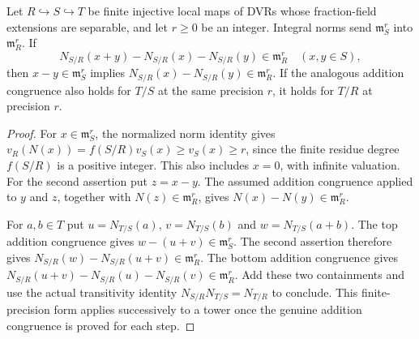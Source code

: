 \begin{lemma}
\label{fw:norm-congruence-tower}
\leanok
Let $R\hookrightarrow S\hookrightarrow T$ be finite injective
local maps of DVRs whose fraction-field extensions are separable,
and let $r\geq0$ be an integer. Integral norms send
$\mathfrak m_S^r$ into $\mathfrak m_R^r$.
If
\[
 N_{S/R}(x+y)-N_{S/R}(x)-N_{S/R}(y)\in\mathfrak m_R^r
 \quad(x,y\in S),
\]
then $x-y\in\mathfrak m_S^r$ implies
$N_{S/R}(x)-N_{S/R}(y)\in\mathfrak m_R^r$.
If the analogous addition congruence also holds for $T/S$ at
the same precision $r$, it holds for $T/R$ at precision $r$.
\end{lemma}
\begin{proof}
For $x\in\mathfrak m_S^r$, the normalized norm identity gives
$v_R(N(x))=f(S/R)v_S(x)\geq v_S(x)\geq r$, since the
finite residue degree $f(S/R)$ is a positive integer. This
also includes $x=0$, with infinite valuation.
For the second assertion put $z=x-y$. The assumed addition
congruence applied to $y$ and $z$, together with
$N(z)\in\mathfrak m_R^r$, gives
$N(x)-N(y)\in\mathfrak m_R^r$.

For $a,b\in T$ put $u=N_{T/S}(a)$, $v=N_{T/S}(b)$ and
$w=N_{T/S}(a+b)$. The top addition congruence gives
$w-(u+v)\in\mathfrak m_S^r$. The second assertion therefore
gives $N_{S/R}(w)-N_{S/R}(u+v)\in\mathfrak m_R^r$.
The bottom addition congruence gives
$N_{S/R}(u+v)-N_{S/R}(u)-N_{S/R}(v)\in\mathfrak m_R^r$.
Add these two containments and use the actual transitivity
identity $N_{S/R}N_{T/S}=N_{T/R}$ to conclude.
This finite-precision form applies successively to a tower once
the genuine addition congruence is proved for each step.
\end{proof}

